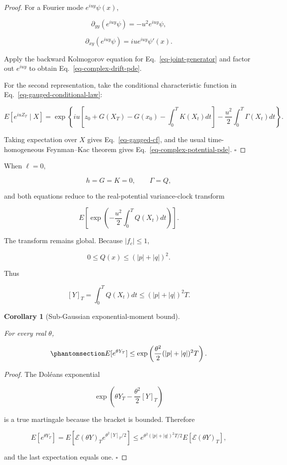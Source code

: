 \documentclass[
  english,
  11pt,
  letterpaper,
  DIV=11,
  numbers=noendperiod]{scrartcl}
\theoremstyle{plain}
\theoremstyle{plain}
\newtheorem{corollary}{Corollary}[section]
\theoremstyle{plain}
\theoremstyle{plain}
\theoremstyle{remark}
\begin{document}
\begin{proof}
For a Fourier mode \(e^{iuy}\psi(x)\),

\[
\partial_{yy}(e^{iuy}\psi)=-u^2e^{iuy}\psi,
\]

\[
\partial_{xy}(e^{iuy}\psi)=iu e^{iuy}\psi'(x).
\]

Apply the backward Kolmogorov equation for Eq.~\ref{eq-joint-generator}
and factor out \(e^{iuy}\) to obtain Eq.~\ref{eq-complex-drift-pde}.

For the second representation, take the conditional characteristic
function in Eq.~\ref{eq-gauged-conditional-law}:

\[
E[e^{iuZ_T}\mid X]
=
\exp\left\{
iu\left[
z_0+G(X_T)-G(x_0)-\int_0^TK(X_t)dt
\right]
-\frac{u^2}{2}\int_0^T\Gamma(X_t)dt
\right\}.
\]

Taking expectation over \(X\) gives Eq.~\ref{eq-gauged-cf}, and the
usual time-homogeneous Feynman--Kac theorem gives
Eq.~\ref{eq-complex-potential-pde}. \(\square\)
\end{proof}

When \(\ell=0\),

\[
h=G=K=0,\qquad \Gamma=Q,
\]

and both equations reduce to the real-potential variance-clock transform

\[
E\left[\exp\left(-\frac{u^2}{2}\int_0^TQ(X_t)dt\right)\right].
\]

The transform remains global. Because \(|f_c|\le1\),

\[
0\le Q(x)\le(|p|+|q|)^2.
\]

Thus

\[
[Y]_T=\int_0^TQ(X_t)dt
\le (|p|+|q|)^2T.
\]

\begin{corollary}[Sub-Gaussian exponential-moment
bound]\protect\hypertarget{cor-subgaussian}{}\label{cor-subgaussian}

For every real \(\theta\),

\begin{equation}\protect\phantomsection\label{eq-subgaussian-bound}{
E[e^{\theta Y_T}]
\le
\exp\left(
\frac{\theta^2}{2}(|p|+|q|)^2T
\right).
}\end{equation}

\end{corollary}

\begin{proof}
The Doléans exponential

\[
\exp\left(\theta Y_T-\frac{\theta^2}{2}[Y]_T\right)
\]

is a true martingale because the bracket is bounded. Therefore

\[
E[e^{\theta Y_T}]
=E\left[
\mathcal E(\theta Y)_T
e^{\theta^2[Y]_T/2}
\right]
\le e^{\theta^2(|p|+|q|)^2T/2}
E[\mathcal E(\theta Y)_T],
\]

and the last expectation equals one. \(\square\)
\end{proof}
\end{document}
